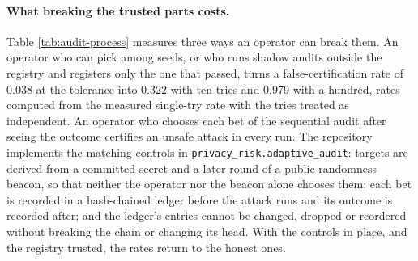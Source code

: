 \documentclass[11pt,a4paper]{article}
\theoremstyle{plain}
\theoremstyle{definition}
\theoremstyle{definition}
\theoremstyle{plain}
\begin{document}




\paragraph{What breaking the trusted parts costs.} Table \ref{tab:audit-process}
measures three ways an operator can break them. An operator who can pick among
seeds, or who runs shadow audits outside the registry and registers only the one
that passed, turns a false-certification rate of 0.038 at the tolerance into
0.322 with ten tries and 0.979 with a hundred, rates computed from the measured
single-try rate with the tries treated as independent. An operator who chooses each bet
of the sequential audit after seeing the outcome certifies an unsafe attack in
every run. The repository implements the matching controls in
\texttt{privacy\_risk.adaptive\_audit}: targets are derived from a committed
secret and a later round of a public randomness beacon, so that neither the
operator nor the beacon alone chooses them; each bet is recorded in a
hash-chained ledger before the attack runs and its outcome is recorded after;
and the ledger's entries cannot be changed, dropped or reordered without breaking
the chain or changing its head. With the controls in place, and the registry
trusted, the rates return to the honest ones.


\end{document}
